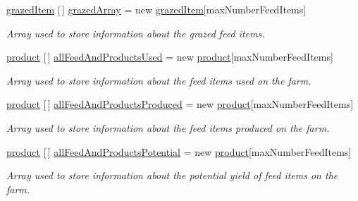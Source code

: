 \begin{DoxyCompactItemize}
\mbox{\label{class_global_vars_a72d7a0bc05f7dd554854b67127849e5b}} 
\mbox{\hyperlink{struct_global_vars_1_1grazed_item}{grazed\+Item}} \mbox{[}$\,$\mbox{]} \mbox{\hyperlink{class_global_vars_a72d7a0bc05f7dd554854b67127849e5b}{grazed\+Array}} = new \mbox{\hyperlink{struct_global_vars_1_1grazed_item}{grazed\+Item}}\mbox{[}max\+Number\+Feed\+Items\mbox{]}
\begin{DoxyCompactList}\small\item\em Array used to store information about the grazed feed items. \end{DoxyCompactList}\item 
\mbox{\label{class_global_vars_aa390108dd9539b57fdfa53809a6834f1}} 
\mbox{\hyperlink{class_global_vars_1_1product}{product}} \mbox{[}$\,$\mbox{]} \mbox{\hyperlink{class_global_vars_aa390108dd9539b57fdfa53809a6834f1}{all\+Feed\+And\+Products\+Used}} = new \mbox{\hyperlink{class_global_vars_1_1product}{product}}\mbox{[}max\+Number\+Feed\+Items\mbox{]}
\begin{DoxyCompactList}\small\item\em Array used to store information about the feed items used on the farm. \end{DoxyCompactList}\item 
\mbox{\label{class_global_vars_a9e40d65b9f8ceb4cca1620a3acb63efb}} 
\mbox{\hyperlink{class_global_vars_1_1product}{product}} \mbox{[}$\,$\mbox{]} \mbox{\hyperlink{class_global_vars_a9e40d65b9f8ceb4cca1620a3acb63efb}{all\+Feed\+And\+Products\+Produced}} = new \mbox{\hyperlink{class_global_vars_1_1product}{product}}\mbox{[}max\+Number\+Feed\+Items\mbox{]}
\begin{DoxyCompactList}\small\item\em Array used to store information about the feed items produced on the farm. \end{DoxyCompactList}\item 
\mbox{\label{class_global_vars_a382e4d64f254414a5db46b6ddc77ee8d}} 
\mbox{\hyperlink{class_global_vars_1_1product}{product}} \mbox{[}$\,$\mbox{]} \mbox{\hyperlink{class_global_vars_a382e4d64f254414a5db46b6ddc77ee8d}{all\+Feed\+And\+Products\+Potential}} = new \mbox{\hyperlink{class_global_vars_1_1product}{product}}\mbox{[}max\+Number\+Feed\+Items\mbox{]}
\begin{DoxyCompactList}\small\item\em Array used to store information about the potential yield of feed items on the farm. \end{DoxyCompactList}\item 

\end{DoxyCompactItemize}

